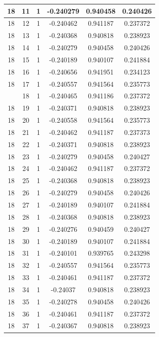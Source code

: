 \documentclass[12pt,a4paper]{article}
\numberwithin{equation}{section}
\numberwithin{figure}{section}
\numberwithin{table}{section}
\begin{document}
\begin{longtable}{|c|c|c|c|c|c|}
18 & 11 & 1 & -0.240279 & 0.940458 & 0.240426 \\ \hline
18 & 12 & 1 & -0.240462 & 0.941187 & 0.237372 \\ \hline
18 & 13 & 1 & -0.240368 & 0.940818 & 0.238923 \\ \hline
18 & 14 & 1 & -0.240279 & 0.940458 & 0.240426 \\ \hline
18 & 15 & 1 & -0.240189 & 0.940107 & 0.241884 \\ \hline
18 & 16 & 1 & -0.240656 & 0.941951 & 0.234123 \\ \hline
18 & 17 & 1 & -0.240557 & 0.941564 & 0.235773 \\ \hline
\pagebreak
18 & 18 & 1 & -0.240465 & 0.941186 & 0.237372 \\ \hline
18 & 19 & 1 & -0.240371 & 0.940818 & 0.238923 \\ \hline
18 & 20 & 1 & -0.240558 & 0.941564 & 0.235773 \\ \hline
18 & 21 & 1 & -0.240462 & 0.941187 & 0.237373 \\ \hline
18 & 22 & 1 & -0.240371 & 0.940818 & 0.238923 \\ \hline
18 & 23 & 1 & -0.240279 & 0.940458 & 0.240427 \\ \hline
18 & 24 & 1 & -0.240462 & 0.941187 & 0.237372 \\ \hline
18 & 25 & 1 & -0.240368 & 0.940818 & 0.238923 \\ \hline
18 & 26 & 1 & -0.240279 & 0.940458 & 0.240426 \\ \hline
18 & 27 & 1 & -0.240189 & 0.940107 & 0.241884 \\ \hline
18 & 28 & 1 & -0.240368 & 0.940818 & 0.238923 \\ \hline
18 & 29 & 1 & -0.240276 & 0.940459 & 0.240427 \\ \hline
18 & 30 & 1 & -0.240189 & 0.940107 & 0.241884 \\ \hline
18 & 31 & 1 & -0.240101 & 0.939765 & 0.243298 \\ \hline
18 & 32 & 1 & -0.240557 & 0.941564 & 0.235773 \\ \hline
18 & 33 & 1 & -0.240461 & 0.941187 & 0.237372 \\ \hline
18 & 34 & 1 & -0.24037 & 0.940818 & 0.238923 \\ \hline
18 & 35 & 1 & -0.240278 & 0.940458 & 0.240426 \\ \hline
18 & 36 & 1 & -0.240461 & 0.941187 & 0.237372 \\ \hline
18 & 37 & 1 & -0.240367 & 0.940818 & 0.238923 \\ \hline

\end{longtable}
\end{document}
